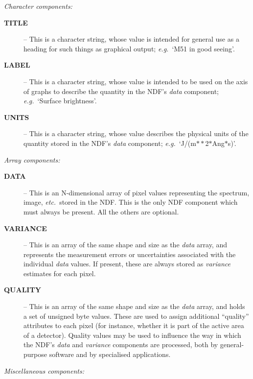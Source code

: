 \documentclass[twoside,11pt,nolof]{starlink}
\providecommand{\st}[1]{{\emph{#1}}}
\begin{document}
{\large \st{Character components:}}

\begin{description}

\item[\textbf{TITLE}] -- This is a character string, whose value is
intended for general use as a heading for such things as graphical output;
\st{e.g.}\ `M51 in good seeing'.

\item[\textbf{LABEL}] -- This is a character string, whose value is
intended to be used on the axis of graphs to describe the quantity in the
NDF's \st{data\/} component; \st{e.g.}\ `Surface brightness'.

\item[\textbf{UNITS}] -- This is a character string, whose value
describes the physical units of the quantity stored in the NDF's \st{data\/}
component; \st{e.g.}\ `J/(m$**$2$*$Ang$*$s)'.

\end{description}

{\large \st{Array components:}}

\begin{description}

\item[\textbf{DATA}] -- This is an N-dimensional array of pixel values
representing the spectrum, image, \st{etc.}\ stored in the NDF.
This is the only NDF component which must always be present.
All the others are optional.

\item[\textbf{VARIANCE}] -- This is an array of the same shape and size
as the \st{data\/} array, and represents the measurement errors or
uncertainties associated with the individual \st{data\/} values.
If present, these are always stored as \st{variance\/} estimates for each
pixel.

\item[\textbf{QUALITY}] -- This is an array of the same shape and size as
the \st{data\/} array, and holds a set of unsigned byte values.
These are used to assign additional ``quality'' attributes to each pixel
(for instance, whether it is part of the active area of a detector).
Quality values may be used to influence the way in which the NDF's
\st{data\/} and \st{variance\/} components are processed, both by
general-purpose
software and by specialised applications.

\end{description}

{\large \st{Miscellaneous components:}}
\end{document}
